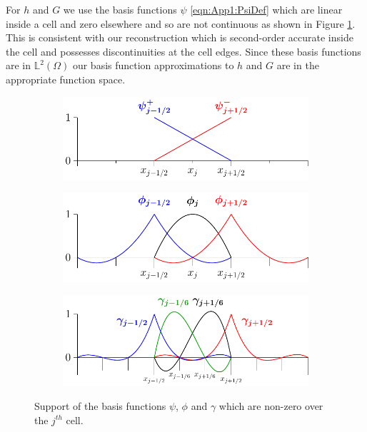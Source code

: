 \documentclass[times]{elsarticle}
\begin{document}
For $h$ and $G$ we use the basis functions $\psi$ \eqref{eqn:App1:PsiDef} which are linear inside a cell and zero elsewhere and so are not continuous as shown in Figure \ref{fig:P1DiscBasis}. This is consistent with our reconstruction which is second-order accurate inside the cell and possesses discontinuities at the cell edges. Since these basis functions are in $\mathbb{L}^2(\Omega)$ our basis function approximations to $h$ and $G$ are in the appropriate function space.
\begin{figure}
	\centering
		\begin{subfigure}{0.45\textwidth}
			\includegraphics[width=\textwidth]{./Figures/Diagrams/FEMbasis/P1/P1NN-figure0.pdf}
			\subcaption{$\psi$}
			\vspace{0.5cm}
		\end{subfigure}
		\begin{subfigure}{0.45\textwidth}
			\includegraphics[width=\textwidth]{./Figures/Diagrams/FEMbasis/P2/P2N-figure0.pdf}
			\subcaption{$\phi$}
			\vspace{0.5cm}
		\end{subfigure}
		\begin{subfigure}{0.6\textwidth}
			\includegraphics[width=\textwidth]{./Figures/Diagrams/FEMbasis/P3/P3-figure0.pdf}
			\subcaption{$\gamma$}
			\vspace{0.5cm}
		\end{subfigure}
	\caption{Support of the basis functions $\psi$, $\phi$ and $\gamma$ which are non-zero over the $j^{th}$ cell.}
	\label{fig:P1DiscBasis}
\end{figure}
\end{document}
